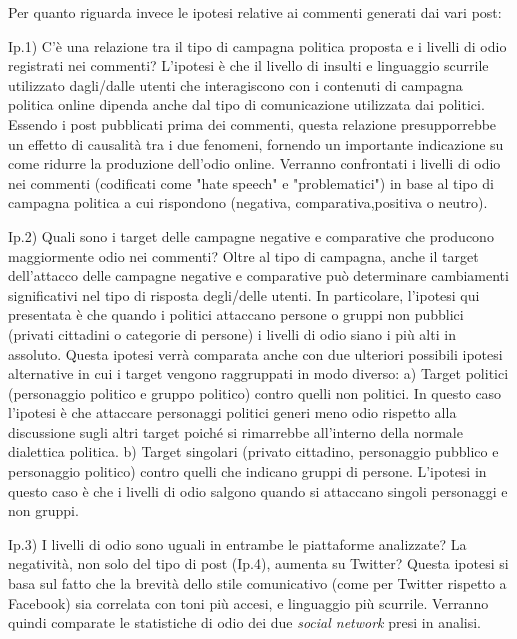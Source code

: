 Per quanto riguarda invece le ipotesi relative ai commenti generati dai  vari post:

Ip.1) C'è una relazione tra il tipo di campagna politica proposta e i livelli di odio registrati nei commenti? L'ipotesi è che il livello di insulti e linguaggio scurrile utilizzato dagli/dalle utenti che interagiscono con i contenuti di campagna politica online dipenda anche dal tipo di comunicazione utilizzata dai politici. Essendo i post pubblicati prima dei commenti, questa relazione presupporrebbe un effetto di causalità tra i due fenomeni, fornendo un importante indicazione su come ridurre la produzione dell'odio online. Verranno confrontati i livelli di odio nei commenti (codificati come "hate speech" e "problematici") in base al tipo di campagna politica a cui rispondono (negativa, comparativa,positiva o neutro).


Ip.2) Quali sono i target delle campagne negative e comparative che producono maggiormente odio nei commenti? Oltre al tipo di campagna, anche il target dell'attacco delle campagne negative e comparative può determinare cambiamenti significativi nel tipo di risposta degli/delle utenti. In particolare, l'ipotesi qui presentata è che quando i politici attaccano persone o gruppi non pubblici (privati cittadini o categorie di persone) i livelli di odio siano i più alti in assoluto. Questa ipotesi verrà comparata anche con due ulteriori possibili ipotesi alternative in cui i target vengono raggruppati in modo diverso: a) Target politici (personaggio politico e gruppo politico) contro quelli non politici. In questo caso l'ipotesi è che attaccare personaggi politici generi meno odio rispetto alla discussione sugli altri target poiché si rimarrebbe all'interno della normale dialettica politica. b) Target singolari (privato cittadino, personaggio pubblico e personaggio politico) contro quelli che indicano gruppi di persone. L'ipotesi in questo caso è che i livelli di odio salgono quando si attaccano singoli personaggi e non gruppi.

Ip.3) I livelli di odio sono uguali in entrambe le piattaforme analizzate? La negatività, non solo del tipo di post (Ip.4), aumenta su Twitter? Questa ipotesi si basa sul fatto che la brevità dello stile comunicativo (come per Twitter rispetto a Facebook) sia correlata con toni più accesi, e linguaggio più scurrile. Verranno quindi comparate le statistiche di odio dei due \textit{social network} presi in analisi.  




